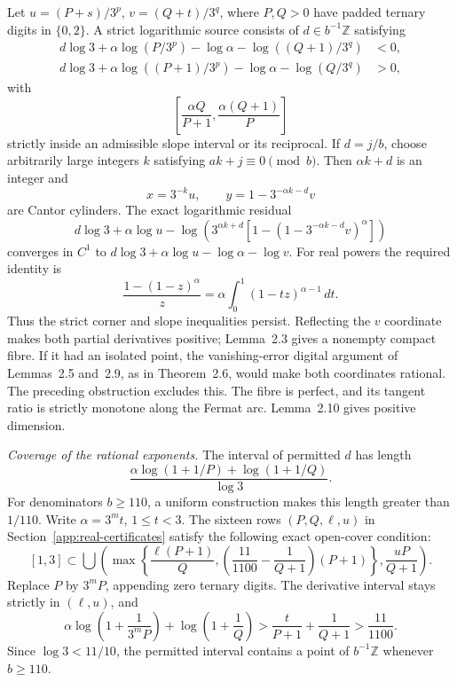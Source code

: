 \documentclass[11pt,a4paper]{article}
\begin{document}
Let \(u=(P+s)/3^p\), \(v=(Q+t)/3^q\), where \(P,Q>0\) have
padded ternary digits in \(\{0,2\}\). A strict logarithmic source
consists of \(d\in b^{-1}\mathbb Z\) satisfying
\begin{align*}
d\log3+\alpha\log(P/3^p)-\log \alpha-\log((Q+1)/3^q)&<0,\\
d\log3+\alpha\log((P+1)/3^p)-\log \alpha-\log(Q/3^q)&>0,
\end{align*}
with
\[
\left[\frac{\alpha Q}{P+1},\frac{\alpha(Q+1)}P\right]
\]
strictly inside an admissible slope interval or its reciprocal.
If \(d=j/b\), choose arbitrarily large integers \(k\) satisfying
\(ak+j\equiv0\pmod b\). Then \(\alpha k+d\) is an integer and
\[
x=3^{-k}u,\qquad y=1-3^{-\alpha k-d}v
\]
are Cantor cylinders. The exact logarithmic residual
\[
d\log3+\alpha\log u-
\log\!\left(3^{\alpha k+d}[1-(1-3^{-\alpha k-d}v)^\alpha]\right)
\]
converges in \(C^1\) to \(d\log3+\alpha\log u-\log \alpha-\log v\).
For real powers the required identity is
\[
\frac{1-(1-z)^\alpha}{z}=\alpha\int_0^1(1-tz)^{\alpha-1}\,dt.
\]
Thus the strict corner and slope inequalities persist. Reflecting
the \(v\) coordinate makes both partial derivatives positive;
Lemma~2.3 gives a nonempty compact fibre.
If it had an isolated point, the vanishing-error digital argument
of Lemmas~2.5 and~2.9, as in
Theorem~2.6, would make both coordinates rational.
The preceding obstruction excludes this. The fibre is perfect,
and its tangent ratio is strictly monotone along the Fermat arc.
Lemma~2.10 gives positive dimension.

\emph{Coverage of the rational exponents.}
The interval of permitted \(d\) has length
\[
\frac{\alpha\log(1+1/P)+\log(1+1/Q)}{\log3}.
\]
For denominators \(b\geq110\), a uniform construction makes this
length greater than \(1/110\). Write \(\alpha=3^m t\), \(1\leq t<3\).
The sixteen rows \((P,Q,\ell,u)\) in
Section~\ref{app:real-certificates} satisfy the following exact
open-cover condition:
\[
[1,3]\subset\bigcup
\left(\max\left\{\frac{\ell(P+1)}Q,
\left(\frac{11}{1100}-\frac1{Q+1}\right)(P+1)\right\},
\frac{uP}{Q+1}\right).
\]
Replace \(P\) by \(3^mP\), appending zero ternary digits.
The derivative interval stays strictly in \((\ell,u)\), and
\[
\alpha\log\left(1+\frac1{3^mP}\right)
+\log\left(1+\frac1Q\right)
>\frac{t}{P+1}+\frac1{Q+1}>\frac{11}{1100}.
\]
Since \(\log3<11/10\), the permitted interval contains a point of
\(b^{-1}\mathbb Z\) whenever \(b\geq110\).
\end{document}
